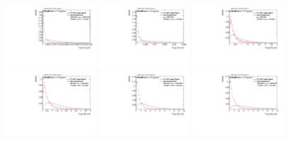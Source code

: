 \begin{figure}[H]
\includegraphics[width=0.3\textwidth]{sascha_input/Appendix/Distributions/w/distributions/beta2/h_normal_tj_C2_2_bin5.pdf} \hspace{1mm}
\includegraphics[width=0.3\textwidth]{sascha_input/Appendix/Distributions/w/distributions/beta2/h_normal_tj_C2_2_bin6.pdf} 
\bigskip
\includegraphics[width=0.3\textwidth]{sascha_input/Appendix/Distributions/w/distributions/beta2/h_normal_tj_D2_2_bin1.pdf} \hspace{1mm}
\includegraphics[width=0.3\textwidth]{sascha_input/Appendix/Distributions/w/distributions/beta2/h_normal_tj_D2_2_bin2.pdf} \hspace{1mm}
\includegraphics[width=0.3\textwidth]{sascha_input/Appendix/Distributions/w/distributions/beta2/h_normal_tj_D2_2_bin3.pdf} 
\bigskip
\includegraphics[width=0.3\textwidth]{sascha_input/Appendix/Distributions/w/distributions/beta2/h_normal_tj_D2_2_bin4.pdf} \hspace{1mm}

\end{figure}
